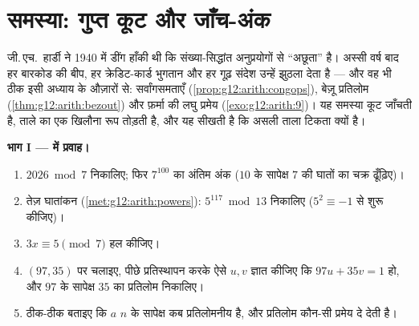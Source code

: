 \section{समस्या: गुप्त कूट और जाँच-अंक}

\begin{problem}
\label{pb:g12:arith:1}
जी.\,एच.~हार्डी ने 1940 में डींग हाँकी थी कि संख्या-सिद्धांत अनुप्रयोगों से
``अछूता'' है। अस्सी वर्ष बाद हर बारकोड की बीप, हर क्रेडिट-कार्ड भुगतान और हर
गूढ़ संदेश उन्हें झुठला देता है --- और वह भी ठीक इसी अध्याय के औज़ारों से:
सर्वांगसमताएँ (\cref{prop:g12:arith:congops}), बेज़ू प्रतिलोम (\cref{thm:g12:arith:bezout}) और फ़र्मा की लघु प्रमेय
(\cref{exo:g12:arith:9})। यह समस्या कूट जाँचती है, ताले का एक खिलौना रूप तोड़ती है, और यह
सीखती है कि असली ताला टिकता क्यों है।

\medskip
\noindent\textbf{भाग I ---  में प्रवाह।}
\begin{enumerate}
  \item $2026 \bmod 7$ निकालिए; फिर $7^{100}$ का अंतिम अंक ($10$ के सापेक्ष $7$ की
        घातों का चक्र ढूँढ़िए)।
  \item तेज़ घातांकन (\cref{met:g12:arith:powers}): $5^{117} \bmod 13$ निकालिए ($5^2 \equiv -1$ से शुरू कीजिए)।
  \item $3x \equiv 5 \pmod 7$ हल कीजिए।
  \item $(97, 35)$ पर  चलाइए, पीछे प्रतिस्थापन करके ऐसे 
        $u, v$ ज्ञात कीजिए कि $97u + 35v = 1$ हो, और $97$ के सापेक्ष $35$ का प्रतिलोम
        निकालिए।
  \item ठीक-ठीक बताइए कि $a$ $n$ के सापेक्ष कब प्रतिलोमनीय है, और
        प्रतिलोम कौन-सी प्रमेय दे देती है।
\end{enumerate}


\end{problem}
